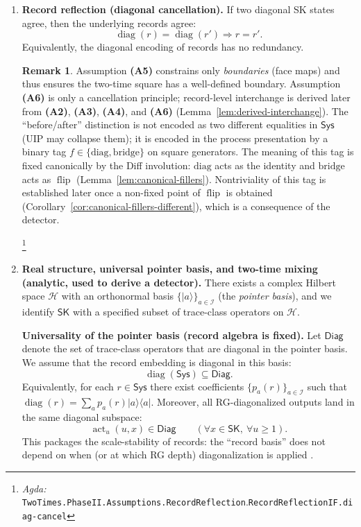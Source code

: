 \documentclass{article}
\newcommand{\Sys}{\mathsf{Sys}}
\newcommand{\SK}{\mathsf{SK}}
\newcommand{\diag}{\operatorname{diag}}
\newcommand{\flip}{\operatorname{flip}}
\newcommand{\actU}{\operatorname{act}_u}
\newcommand{\Agda}[1]{\texttt{#1}}
\newcommand{\AgdaRef}[2]{\emph{Agda: }\Agda{#1}.\Agda{#2}}
\newcommand{\AgdaNote}[2]{\footnote{\AgdaRef{#1}{#2}}}
\theoremstyle{definition}
\newtheorem{remark}{Remark}[section]
\theoremstyle{plain}
\begin{document}
\begin{enumerate}[label=\textbf{(A\arabic*)},leftmargin=*,itemsep=0.6em]
\item \textbf{Record reflection (diagonal cancellation).}
If two diagonal SK states agree, then the underlying records agree:
\[
  \diag(r) = \diag(r') \Rightarrow r = r'.
\]
Equivalently, the diagonal encoding of records has no redundancy.

\begin{remark}
\label{rem:limited-scope-theorem-translation-001}
Assumption \textbf{(A5)} constrains only \emph{boundaries} (face maps) and thus
ensures the two-time square has a well-defined boundary. Assumption \textbf{(A6)}
is only a cancellation principle; record-level interchange is derived later from
\textbf{(A2)}, \textbf{(A3)}, \textbf{(A4)}, and \textbf{(A6)} (Lemma~\ref{lem:derived-interchange}). The
``before/after'' distinction is not encoded as two different equalities in
$\Sys$ (UIP may collapse them); it is encoded in the process presentation by a
binary tag $f\in\{\mathrm{diag},\mathrm{bridge}\}$ on square generators. The
meaning of this tag is fixed canonically by the Diff involution: $\mathrm{diag}$
acts as the identity and $\mathrm{bridge}$ acts as $\flip$ (Lemma~\ref{lem:canonical-fillers}).
Nontriviality of this tag is established later once a non-fixed point of $\flip$
is obtained (Corollary~\ref{cor:canonical-fillers-different}), which is a
consequence of the detector.
\end{remark}
\AgdaNote{TwoTimes.PhaseII.Assumptions.RecordReflection}{RecordReflectionIF.diag-cancel}

\item \textbf{Real structure, universal pointer basis, and two-time mixing (analytic, used to derive a detector).}
There exists a complex Hilbert space $\mathcal H$ with an orthonormal basis
$\{\lvert a\rangle\}_{a\in\mathcal I}$ (the \emph{pointer basis}), and we identify
$\SK$ with a specified subset of trace-class operators on $\mathcal H$.

\medskip
\noindent
\textbf{Universality of the pointer basis (record algebra is fixed).}
Let $\mathsf{Diag}$ denote the set of trace-class operators that are diagonal in the pointer basis.
We assume that the record embedding is diagonal in this basis:
\[
  \diag(\Sys)\subseteq \mathsf{Diag}.
\]
Equivalently, for each $r\in\Sys$ there exist coefficients $\{p_a(r)\}_{a\in\mathcal I}$
such that $\diag(r)=\sum_a p_a(r)\lvert a\rangle\langle a\rvert$.
Moreover, all RG-diagonalized outputs land in the same diagonal subspace:
\[
  \actU(u,x)\in \mathsf{Diag}\qquad(\forall x\in\SK,\ \forall u\ge 1).
\]
This packages the scale-stability of records: the ``record basis'' does not depend on
when (or at which RG depth) diagonalization is applied \cite{Zurek1981PointerBasis,JoosZeh1985Emergence,Zurek2003Decoherence}.


\end{enumerate}
\end{document}
